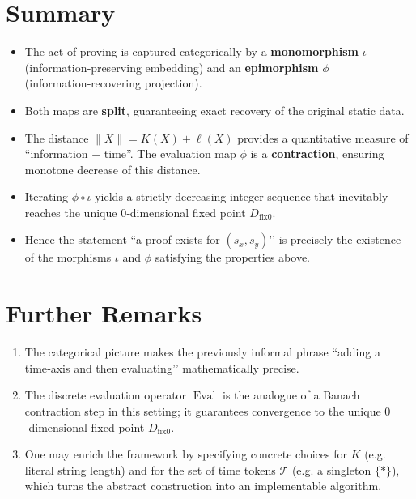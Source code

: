 \documentclass[12pt,a4paper]{article}
\newcommand{\dfix}{D_{\mathrm{fix}0}} %
\newcommand{\Tset}{\mathcal{T}}          %
\begin{document}
\section{Summary}

\begin{itemize}[nosep]
  \item The act of proving is captured categorically by a
        \textbf{monomorphism} $\iota$ (information‑preserving embedding) and an
        \textbf{epimorphism} $\phi$ (information‑recovering projection).
  \item Both maps are \textbf{split}, guaranteeing exact recovery of the
        original static data.
  \item The distance $\|X\|=K(X)+\ell(X)$ provides a quantitative measure of
        ``information + time''.  The evaluation map $\phi$ is a
        \textbf{contraction}, ensuring monotone decrease of this distance.
  \item Iterating $\phi\!\circ\!\iota$ yields a strictly decreasing integer
        sequence that inevitably reaches the unique $0$‑dimensional fixed
        point $\dfix$.
  \item Hence the statement “a proof exists for $(s_x,s_y)$’’ is precisely the
        existence of the morphisms $\iota$ and $\phi$ satisfying the
        properties above.
\end{itemize}

\section{Further Remarks}

\begin{enumerate}
  \item The categorical picture makes the previously informal phrase
        “adding a time‑axis and then evaluating’’ mathematically precise.
  \item The discrete evaluation operator $\operatorname{Eval}$ is the analogue
        of a Banach contraction step in this setting; it guarantees
        convergence to the unique $0$‑dimensional fixed point $\dfix$.
  \item One may enrich the framework by specifying concrete choices for
        $K$ (e.g. literal string length) and for the set of time tokens
        $\Tset$ (e.g. a singleton $\{*\}$), which turns the abstract
        construction into an implementable algorithm.
\end{enumerate}
\end{document}
